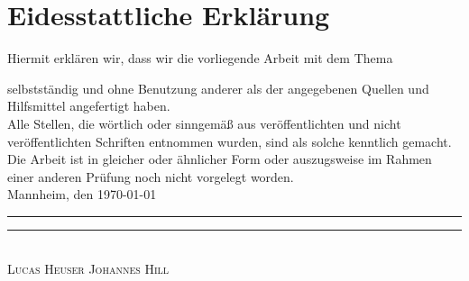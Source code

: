 \chapter*{Eidesstattliche Erklärung}

Hiermit erklären wir, dass wir die vorliegende Arbeit mit dem Thema
\begin{quote}
\textit{\titel}%
\end{quote}
selbstständig und ohne Benutzung anderer als der angegebenen Quellen und Hilfsmittel angefertigt haben. \\[2ex]
Alle Stellen, die wörtlich oder sinngemäß aus veröffentlichten und nicht veröffentlichten Schriften entnommen wurden, sind als solche kenntlich gemacht. \\[2ex]
Die Arbeit ist in gleicher oder ähnlicher Form oder auszugsweise im Rahmen einer anderen Prüfung noch nicht vorgelegt worden.
\\[10ex]


Mannheim, den \today \\[4ex]


\rule[-0.2cm]{5cm}{0.5pt} \hspace{4cm} \rule[-0.2cm]{5cm}{0.5pt} \\

\textsc{Lucas Heuser} \hspace{6,6cm} \textsc{Johannes Hill}

